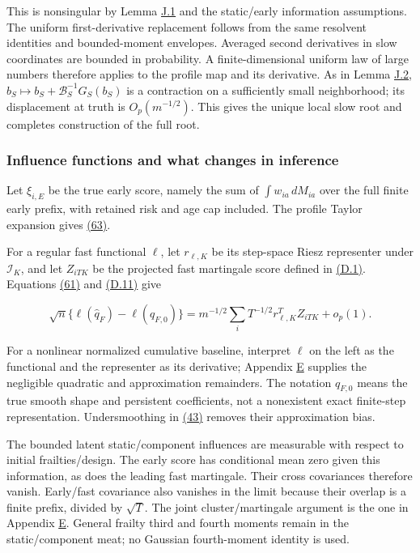 \documentclass[11pt]{article}
\begin{document}
This is nonsingular by Lemma \hyperref[res:Lemma-J.1]{J.1} and the static/early information assumptions. The uniform first-derivative replacement follows from the same resolvent identities and bounded-moment envelopes. Averaged second derivatives in slow coordinates are bounded in probability. A finite-dimensional uniform law of large numbers therefore applies to the profile map and its derivative. As in Lemma \hyperref[res:Lemma-J.2]{J.2}, \(b_S\mapsto b_S+\mathcal B_S^{-1}G_S(b_S)\) is a contraction on a sufficiently small neighborhood; its displacement at truth is \(O_p(m^{-1/2})\). This gives the unique local slow root and completes construction of the full root.

\subsubsection{Influence functions and what changes in inference}\label{sec:J.7.2}

Let \(\xi_{i,E}\) be the true early score, namely the sum of \(\int w_{ia}\,dM_{ia}\) over the full finite early prefix, with retained risk and age cap included. The profile Taylor expansion gives \hyperref[eq:63]{(63)}.

For a regular fast functional \(\ell\), let \(r_{\ell,K}\) be its step-space Riesz representer under \(\mathcal I_K\), and let \(Z_{iTK}\) be the projected fast martingale score defined in \hyperref[eq:D.1]{(D.1)}. Equations \hyperref[eq:61]{(61)} and \hyperref[eq:D.11]{(D.11)} give

\begin{equation*}
\sqrt n\{\ell(\widehat q_F)-\ell(q_{F,0})\}
 =m^{-1/2}\sum_i T^{-1/2}r_{\ell,K}^TZ_{iTK}+o_p(1).
\tag{J.28}\label{eq:J.28}
\end{equation*}

For a nonlinear normalized cumulative baseline, interpret \(\ell\) on the left as the functional and the representer as its derivative; Appendix \hyperref[sec:E]{E} supplies the negligible quadratic and approximation remainders. The notation \(q_{F,0}\) means the true smooth shape and persistent coefficients, not a nonexistent exact finite-step representation. Undersmoothing in \hyperref[eq:43]{(43)} removes their approximation bias.

The bounded latent static/component influences are measurable with respect to initial frailties/design. The early score has conditional mean zero given this information, as does the leading fast martingale. Their cross covariances therefore vanish. Early/fast covariance also vanishes in the limit because their overlap is a finite prefix, divided by \(\sqrt T\). The joint cluster/martingale argument is the one in Appendix \hyperref[sec:E]{E}. General frailty third and fourth moments remain in the static/component meat; no Gaussian fourth-moment identity is used.
\end{document}
